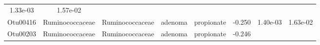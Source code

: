\documentclass[11pt,]{article}
\begin{document}
\begin{longtable}[]{@{}cccccccc@{}}
\begin{minipage}[t]{0.08\columnwidth}
1.33e-03\strut
\end{minipage} & \begin{minipage}[t]{0.08\columnwidth}\centering\strut
1.57e-02\strut
\end{minipage}\tabularnewline
\begin{minipage}[t]{0.08\columnwidth}\centering\strut
Otu00416\strut
\end{minipage} & \begin{minipage}[t]{0.15\columnwidth}\centering\strut
Ruminococcaceae\strut
\end{minipage} & \begin{minipage}[t]{0.15\columnwidth}\centering\strut
Ruminococcaceae\strut
\end{minipage} & \begin{minipage}[t]{0.08\columnwidth}\centering\strut
adenoma\strut
\end{minipage} & \begin{minipage}[t]{0.09\columnwidth}\centering\strut
propionate\strut
\end{minipage} & \begin{minipage}[t]{0.07\columnwidth}\centering\strut
-0.250\strut
\end{minipage} & \begin{minipage}[t]{0.08\columnwidth}\centering\strut
1.40e-03\strut
\end{minipage} & \begin{minipage}[t]{0.08\columnwidth}\centering\strut
1.63e-02\strut
\end{minipage}\tabularnewline
\begin{minipage}[t]{0.08\columnwidth}\centering\strut
Otu00203\strut
\end{minipage} & \begin{minipage}[t]{0.15\columnwidth}\centering\strut
Ruminococcaceae\strut
\end{minipage} & \begin{minipage}[t]{0.15\columnwidth}\centering\strut
Ruminococcaceae\strut
\end{minipage} & \begin{minipage}[t]{0.08\columnwidth}\centering\strut
adenoma\strut
\end{minipage} & \begin{minipage}[t]{0.09\columnwidth}\centering\strut
propionate\strut
\end{minipage} & \begin{minipage}[t]{0.07\columnwidth}\centering\strut
-0.246\strut
\end{minipage} & \begin{minipage}[t]{0.08\columnwidth}\centering\strut

\end{minipage}
\end{longtable}
\end{document}
